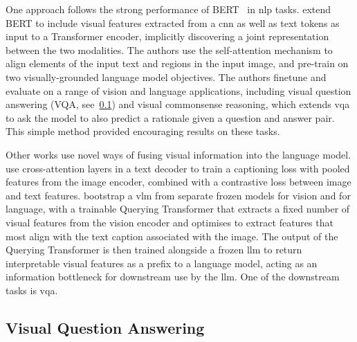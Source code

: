 One approach follows the strong performance of BERT~\citep{devlin2019bert} in
\acrshort{nlp} tasks. \citet{li2019visualbert} extend BERT to include visual
features extracted from a \acrshort{cnn} as well as text tokens as input to a
Transformer encoder, implicitly discovering a joint representation between the
two modalities. The authors use the self-attention mechanism to align elements
of the input text and regions in the input image, and pre-train on two
visually-grounded language model objectives. The authors finetune and evaluate
on a range of vision and language applications, including visual question
answering (VQA, see~\cref{ssec:vqa}) and visual commonsense reasoning, which
extends \acrshort{vqa} to ask the model to also predict a rationale given a
question and answer pair. This simple method provided encouraging results on
these tasks.

Other works use novel ways of fusing visual information into the language
model. \citet{yu2022coca} use cross-attention layers in a text decoder to train
a captioning loss with pooled features from the image encoder, combined with a
contrastive loss between image and text features. \citet{li2023blip2}
bootstrap a \acrshort{vlm} from separate frozen models for vision and for
language, with a trainable Querying Transformer that extracts a fixed number of
visual features from the vision encoder and optimises to extract features that
most align with the text caption associated with the image. The output of the
Querying Transformer is then trained alongside a frozen \acrshort{llm} to
return interpretable visual features as a prefix to a language model, acting as
an information bottleneck for downstream use by the \acrshort{llm}. One of the
downstream tasks is \acrlong{vqa}.

\subsection{Visual Question Answering}
\label{ssec:vqa}


